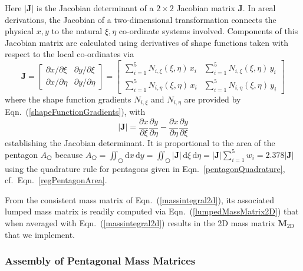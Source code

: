 Here $|\mathbf{J}|$ is the Jacobian determinant of a $2 \! \times \! 2$ Jacobian matrix $\mathbf{J}$.  In areal derivations, the Jacobian of a two-dimensional transformation connects the physical ${x, y}$ to the natural ${\xi, \eta}$ co-ordinate systems involved.  Components of this Jacobian matrix are calculated using derivatives of shape functions taken with respect to the local co-ordinates via \cite[pg.~424]{Reddy93}
\begin{equation}
\mathbf{J} = 
\begin{bmatrix}
\partial x / \partial\xi & \partial y / \partial\xi \\
\partial x / \partial\eta & \partial y / \partial\eta 
\end{bmatrix}  
= \begin{bmatrix}
\sum\nolimits_{i=1}^5 N_{i,\xi} (\xi,\eta) \, x_i & \sum\nolimits_{i=1}^5 N_{i,\xi} (\xi,\eta) \, y_i \\
\sum\nolimits_{i=1}^5 N_{i,\eta} (\xi,\eta) \, x_i & \sum\nolimits_{i=1}^5 N_{i,\eta} (\xi,\eta) \, y_i
\end{bmatrix}
\label{jacobian2D}
\end{equation}
where the shape function gradients $N_{i,\xi}$ and $N_{i,\eta}$ are provided by Eqn.~(\ref{shapeFunctionGradients}), with
\begin{equation}
| \mathbf{J} | = \frac{\partial x}{\partial \xi} \frac{\partial y}{\partial \eta} - 
\frac{\partial x}{\partial \eta} \frac{\partial y}{\partial \xi}
\label{jacobianpent}
\end{equation}
establishing the Jacobian determinant.  It is proportional to the area of the pentagon $A_{\pentagon}$ because $A_{\pentagon} = \iint_{\pentagon} \mathrm{d}x \, \mathrm{d}y = \iint_{\pentagon} | \mathbf{J} | \, \mathrm{d}\xi \, \mathrm{d}\eta = | \mathbf{J} | \sum_{i=1}^5 w_i = 2.378 | \mathbf{J} |$ using the quadrature rule for pentagons given in Eqn.~\eqref{pentagonQuadrature}, cf.\ Eqn.~\eqref{regPentagonArea}.

From the consistent mass matrix of Eqn.~(\ref{massintegral2d}), its associated lumped mass matrix is readily computed via Eqn.~(\ref{lumpedMassMatrix2D}) that when averaged with Eqn.~(\ref{massintegral2d}) results in the 2D mass matrix $\mathbf{M}_{\mathrm{2D}}$ that we implement.

\subsubsection{Assembly of Pentagonal Mass Matrices}

